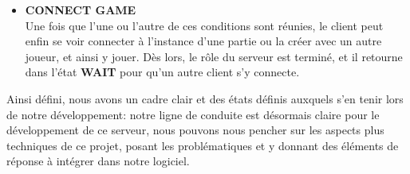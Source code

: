 \begin{itemize}
	
	\item \textbf{CONNECT GAME}\\
	Une fois que l'une ou l'autre de ces conditions sont réunies, le client peut enfin se voir connecter à l'instance d'une partie ou la créer avec un autre joueur, et ainsi y jouer. Dès lors, le rôle du serveur est terminé, et il retourne dans l'état \textbf{WAIT} pour qu'un autre client s'y connecte.
	
	
\end{itemize}

\vspace{6em}
Ainsi défini, nous avons un cadre clair et des états définis auxquels s'en tenir lors de notre développement: notre ligne de conduite est désormais claire pour le développement de ce serveur, nous pouvons nous pencher sur les aspects plus techniques de ce projet, posant les problématiques et y donnant des éléments de réponse à intégrer dans notre logiciel.
